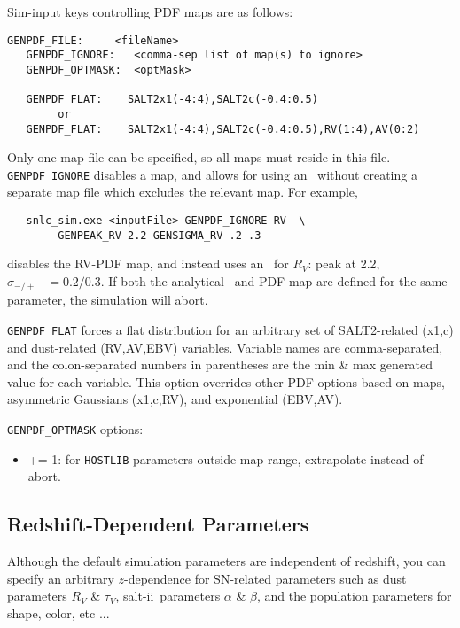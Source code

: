 \documentclass[12pt]{article}
\newcommand{\SALTII}{{\sc salt-ii}}
\begin{document}
Sim-input keys controlling PDF maps are as follows:
\begin{Verbatim}[frame=single]
   GENPDF_FILE:     <fileName>
   GENPDF_IGNORE:   <comma-sep list of map(s) to ignore>
   GENPDF_OPTMASK:  <optMask>

   GENPDF_FLAT:    SALT2x1(-4:4),SALT2c(-0.4:0.5)
        or
   GENPDF_FLAT:    SALT2x1(-4:4),SALT2c(-0.4:0.5),RV(1:4),AV(0:2) 
\end{Verbatim}
%
Only one map-file can be specified, so all maps must reside in this file.
{\tt GENPDF\_IGNORE} disables a map, and allows for using an \AG\
without creating a separate map file which excludes
the relevant map. For example,
\begin{verbatim}
   snlc_sim.exe <inputFile> GENPDF_IGNORE RV  \
        GENPEAK_RV 2.2 GENSIGMA_RV .2 .3
\end{verbatim}
%
disables the RV-PDF map, and instead uses an \AG\ for 
$R_V$:  peak at 2.2, $\sigma_{-/+} -= 0.2/0.3$.
If both the analytical \AG\ and PDF map are defined for the same
parameter, the simulation will abort. 

\clearpage
{\tt GENPDF\_FLAT} forces a flat distribution for an arbitrary
set of SALT2-related (x1,c) and dust-related (RV,AV,EBV) variables.
Variable names are comma-separated, 
and the colon-separated numbers in parentheses are the 
min \& max generated value for each variable.
This option overrides other PDF options based on
maps, asymmetric Gaussians (x1,c,RV), and exponential (EBV,AV).

\medskip\noindent
{\tt GENPDF\_OPTMASK} options:
\begin{itemize}
  \item {+= 1:} for {\tt HOSTLIB} parameters outside map range,
       extrapolate instead of abort. 
\end{itemize}  


   \clearpage
   \subsection{Redshift-Dependent Parameters}
   \label{subsec:zvar}

Although the default simulation parameters are 
independent of redshift, you can specify an arbitrary 
$z$-dependence for SN-related parameters such as
dust parameters $R_V$ \& $\tau_V$, 
\SALTII\ parameters $\alpha$ \& $\beta$, and
the population parameters for shape, color, etc ...
\end{document}
